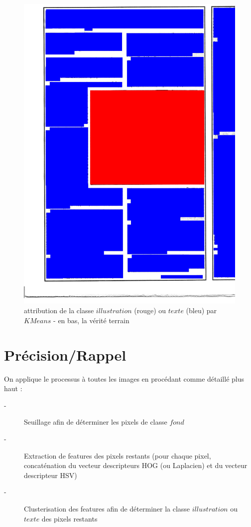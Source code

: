 \documentclass{book}
\begin{document}
\begin{figure}[H]
\begin{center}
\includegraphics[scale=0.3]{images/1g_m.jpg}
\end{center}
\caption{attribution de la classe $illustration$ (rouge) ou $texte$ (bleu) par $KMeans$ - en bas, la vérité terrain}
\label{resultat}
\end{figure}

\chapter{Précision/Rappel}

On applique le processus à toutes les images en procédant comme détaillé plus haut :

\begin{description}
 \item[-] Seuillage afin de déterminer les pixels de classe $fond$
 \item[-] Extraction de features des pixels restants (pour chaque pixel, concaténation du vecteur descripteurs HOG (ou Laplacien) et du vecteur descripteur HSV)
 \item[-] Clusterisation des features afin de déterminer la classe $illustration$ ou $texte$ des pixels restants
\end{description}
\end{document}
